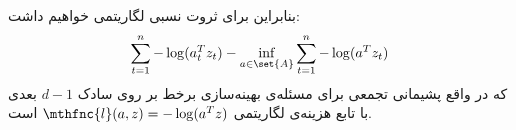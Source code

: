 بنابراین برای ثروت نسبی لگاریتمی
خواهیم داشت:
\[
\sum^{n}_{t=1} - \log ( a^T_t z_t ) - \inf_{a \in \set{A}} \sum^{n}_{t=1} - \log (a^T z_t)
\]
که در واقع پشیمانی تجمعی برای مسئله‌ی بهینه‌سازی برخط بر روی سادک
$d-1$ 
بعدی با تابع هزینه‌ی لگاریتمی 
$\mthfnc{l} (a,z) = -\log (a^T z)$ 
است.












































